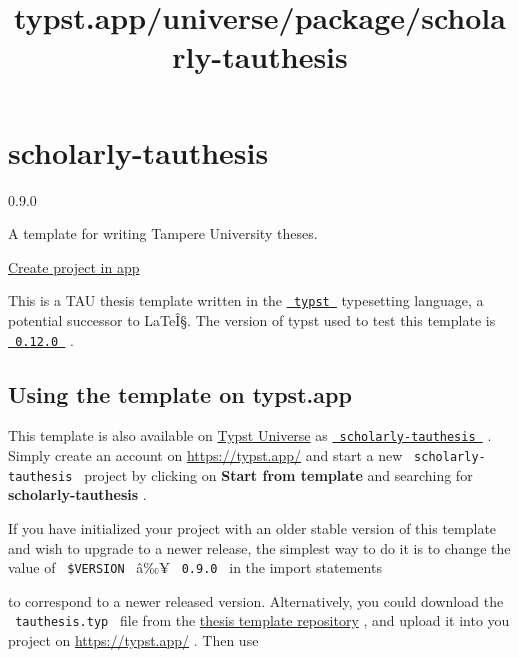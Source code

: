 \title{typst.app/universe/package/scholarly-tauthesis}

\label{banner}
\label{template-thumbnail}

\section{scholarly-tauthesis}\label{scholarly-tauthesis}

{ 0.9.0 }

A template for writing Tampere University theses.

\href{/app?template=scholarly-tauthesis&version=0.9.0}{Create project in
app}

\label{readme}
This is a TAU thesis template written in the
\href{https://github.com/typst/typst}{\texttt{\ typst\ }} typesetting
language, a potential successor to LaTeÎ§. The version of typst used to
test this template is
\href{https://github.com/typst/typst/releases/tag/v0.12.0}{\texttt{\ 0.12.0\ }}
.

\subsection{Using the template on
typst.app}\label{using-the-template-on-typst.app}

This template is also available on
\href{https://typst.app/universe}{Typst Universe} as
\href{https://typst.app/universe/package/scholarly-tauthesis}{\texttt{\ scholarly-tauthesis\ }}
. Simply create an account on \url{https://typst.app/} and start a new
\texttt{\ scholarly-tauthesis\ } project by clicking on \textbf{Start
from template} and searching for \textbf{scholarly-tauthesis} .

If you have initialized your project with an older stable version of
this template and wish to upgrade to a newer release, the simplest way
to do it is to change the value of \texttt{\ \$VERSION\ } â‰¥
\texttt{\ 0.9.0\ } in the import statements

\begin{Shaded}
\begin{Highlighting}[]
\end{Highlighting}
\end{Shaded}

to correspond to a newer released version. Alternatively, you could
download the \texttt{\ tauthesis.typ\ } file from the
\href{https://gitlab.com/tuni-official/thesis-templates/tau-typst-thesis-template}{thesis
template repository} , and upload it into you project on
\url{https://typst.app/} . Then use

